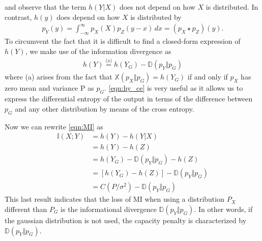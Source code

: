 and observe that the term $h(Y \vert X)$ does not depend on how $X$ is distributed. In contrast, $h(y)$ does depend on how $X$ is distributed by
\begin{align}
	p_Y(y) = \int_{-\infty}^{\infty} p_X(X)p_Z(y -x) \,dx = (p_X \star p_Z)(y).
\end{align}
To circumvent the fact that it is difficult to find a closed-form expression of $h(Y)$, we make use of the information divergence as
\begin{align}
\label{eqn:hy_ce}
	h(Y) \overset{\text{(a)}}{=}  h(Y_G) - \mathbb{D}(p_Y \Vert p_G)
\end{align}
where (a) arises from the fact that $\mathbb{X}(p_X \Vert p_G) = h(Y_G)$ if and only if $p_X$ has zero mean and variance P as $p_G$. \ref{eqn:hy_ce} is very useful as it allows us to express the differential entropy of the output in terms of the difference between $p_G$ and any other distribution by means of the cross entropy. 

Now we can rewrite \ref{eqn:MI} as
\begin{align}
	\mathbb{I}(X;Y) &= h(Y) - h(Y \vert X)\\
	& = h(Y) - h(Z)\\
	& = h(Y_G) - \mathbb{D}(p_Y \Vert p_G) - h(Z)\\
	& = [h(Y_G) - h(Z)] - \mathbb{D}(p_Y \Vert p_G)\\
	& = C(P/\sigma^2) - \mathbb{D}(p_Y \Vert p_G)  \label{eq:C_minus_D}
\end{align}
This last result indicates that the loss of MI when using a distribution $P_X$ different than $P_G$ is the informational divergence $\mathbb{D}(p_Y \Vert p_G)$. In other words, if the gaussian distribution is not used, the capacity penalty is characterized by $\mathbb{D}(p_Y \Vert p_G)$.\\

